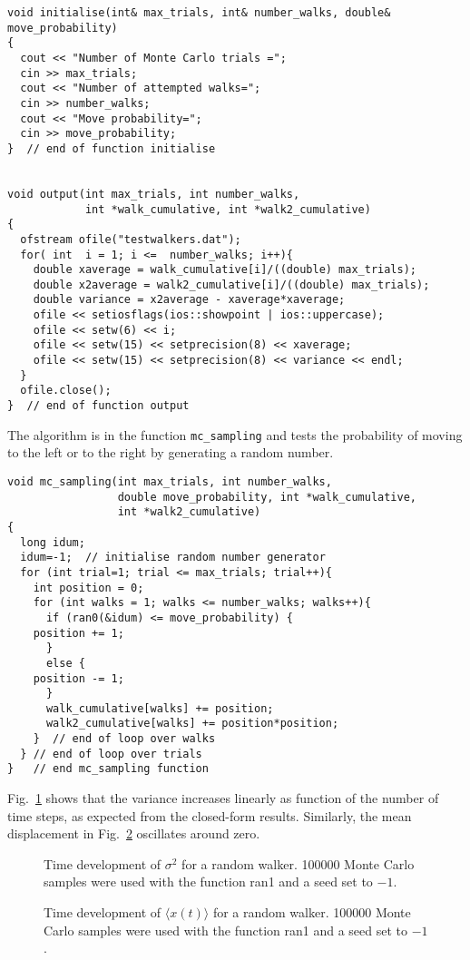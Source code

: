 \begin{lstlisting} 
void initialise(int& max_trials, int& number_walks, double& move_probability) 
{
  cout << "Number of Monte Carlo trials ="; 
  cin >> max_trials;
  cout << "Number of attempted walks=";
  cin >> number_walks;
  cout << "Move probability=";
  cin >> move_probability;
}  // end of function initialise   


void output(int max_trials, int number_walks, 
            int *walk_cumulative, int *walk2_cumulative)
{
  ofstream ofile("testwalkers.dat");
  for( int  i = 1; i <=  number_walks; i++){
    double xaverage = walk_cumulative[i]/((double) max_trials);
    double x2average = walk2_cumulative[i]/((double) max_trials);
    double variance = x2average - xaverage*xaverage;
    ofile << setiosflags(ios::showpoint | ios::uppercase);
    ofile << setw(6) << i;
    ofile << setw(15) << setprecision(8) << xaverage;
    ofile << setw(15) << setprecision(8) << variance << endl;
  }
  ofile.close();
}  // end of function output 
\end{lstlisting}
The algorithm is in the function \lstinline{mc_sampling} and tests the probability 
of moving to the left or to the right by generating a random number.
\begin{lstlisting}
void mc_sampling(int max_trials, int number_walks, 
                 double move_probability, int *walk_cumulative, 
                 int *walk2_cumulative)
{
  long idum;
  idum=-1;  // initialise random number generator
  for (int trial=1; trial <= max_trials; trial++){
    int position = 0;
    for (int walks = 1; walks <= number_walks; walks++){   
      if (ran0(&idum) <= move_probability) {
	position += 1;
      } 
      else {
	position -= 1;
      }
      walk_cumulative[walks] += position;
      walk2_cumulative[walks] += position*position;
    }  // end of loop over walks
  } // end of loop over trials
}   // end mc_sampling function  
\end{lstlisting}
Fig.~\ref{fig:random1sigma} shows that the variance increases linearly as function
of the number of time steps, as expected from the closed-form results.
Similarly, the mean displacement in Fig.~\ref{fig:random1x} oscillates around zero.
\begin{figure}
\begin{center}

\caption{Time development of $\sigma^2$
 for a random walker. 100000
Monte Carlo samples were used with the function ran1 and a seed set to  $-1$.\label{fig:random1sigma}}
\end{center}
\end{figure}
\begin{figure}
\begin{center}

\caption{Time development of $\langle x(t) \rangle $ for a random walker. 100000
Monte Carlo samples were used with the function ran1 and a seed set to  $-1$.\label{fig:random1x}}
\end{center}
\end{figure}




